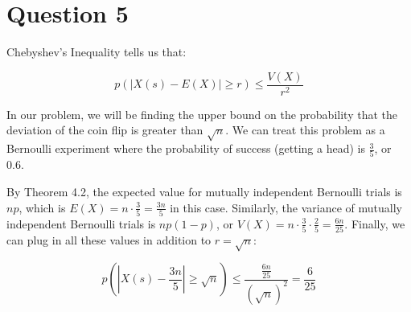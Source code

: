 \documentclass[11pt]{article}
\begin{document}
\section*{Question 5}
Chebyshev's Inequality tells us that:

\[p(\left|X(s) - E(X)\right| \geq r) \leq \frac{V(X)}{r^2}\]

In our problem, we will be finding the upper bound on the probability that the deviation of the coin flip is greater than $\sqrt{n}$. We can treat this problem as a Bernoulli experiment where the probability of success (getting a head) is $\frac{3}{5}$, or 0.6. 

By Theorem 4.2, the expected value for mutually independent Bernoulli trials is $np$, which is $E(X) = n \cdot \frac{3}{5} = \frac{3n}{5}$ in this case. Similarly, the variance of mutually independent Bernoulli trials is $np(1-p)$, or $V(X) = n \cdot \frac{3}{5} \cdot \frac{2}{5} = \frac{6n}{25}$. Finally, we can plug in all these values in addition to $r = \sqrt{n}$:

\[p\left(\left|X(s) - \frac{3n}{5}\right| \geq \sqrt{n} \right) \leq \frac{\frac{6n}{25}}{{(\sqrt{n})}^2} = \frac{6}{25}\]
\end{document}
